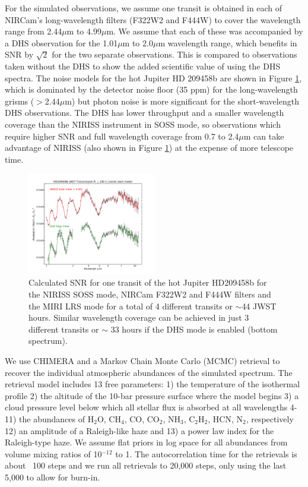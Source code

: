 \documentclass[iop]{emulateapj}
\begin{document}
For the simulated observations, we assume one transit is obtained in each of NIRCam's long-wavelength filters (F322W2 and F444W) to cover the wavelength range from 2.44$\mu$m to 4.99$\mu$m.
We assume that each of these was accompanied by a DHS observation for the 1.01$\mu$m to 2.0$\mu$m wavelength range, which benefits in SNR by $\sqrt{2}$ for the two separate observations.
This is compared to observations taken without the DHS to show the added scientific value of using the DHS spectra.
The noise models for the hot Jupiter HD 209458b are shown in Figure \ref{fig:DHSvsNIRISS209}, which is dominated by the detector noise floor (35 ppm) for the long-wavelength grisms ($>$2.44$\mu$m) but photon noise is more significant for the short-wavelength DHS observations.
The DHS has lower throughput and a smaller wavelength coverage than the NIRISS instrument in SOSS mode, so observations which require higher SNR and full wavelength coverage from 0.7 to 2.4$\mu$m can take advantage of NIRISS (also shown in Figure \ref{fig:DHSvsNIRISS209}) at the expense of more telescope time.

\begin{figure}
\centering
\includegraphics[width=0.5\textwidth]{HD209458b_solar_clear_1transit_DHS_vs_NIRISS_NIRCam_MIRILRS_R100.pdf}
\caption{Calculated SNR for one transit of the hot Jupiter HD209458b for the NIRISS SOSS mode, NIRCam F322W2 and F444W filters and the MIRI LRS mode for a total of 4 different transits or $\sim$44 JWST hours.
Similar wavelength coverage can be achieved in just 3 different transits or $\sim$ 33 hours if the DHS mode is enabled (bottom spectrum).}\label{fig:DHSvsNIRISS209}
\end{figure}

We use CHIMERA and a Markov Chain Monte Carlo (MCMC) retrieval to recover the individual atmospheric abundances of the simulated spectrum.
The retrieval model includes 13 free parameters: 1) the temperature of the isothermal profile 2) the altitude of the 10-bar pressure surface where the model begins 3) a cloud pressure level below which all stellar flux is absorbed at all wavelengths 4-11) the abundances of H$_2$O, CH$_4$, CO, CO$_2$, NH$_3$, C$_2$H$_2$, HCN, N$_2$, respectively 12) an amplitude of a Raleigh-like haze and 13) a power law index for the Raleigh-type haze.
We assume flat priors in log space for all abundances from volume mixing ratios of 10$^{-12}$ to 1.
The autocorrelation time for the retrievals is about ~100 steps and we run all retrievals to 20,000 steps, only using the last 5,000 to allow for burn-in.
\end{document}
